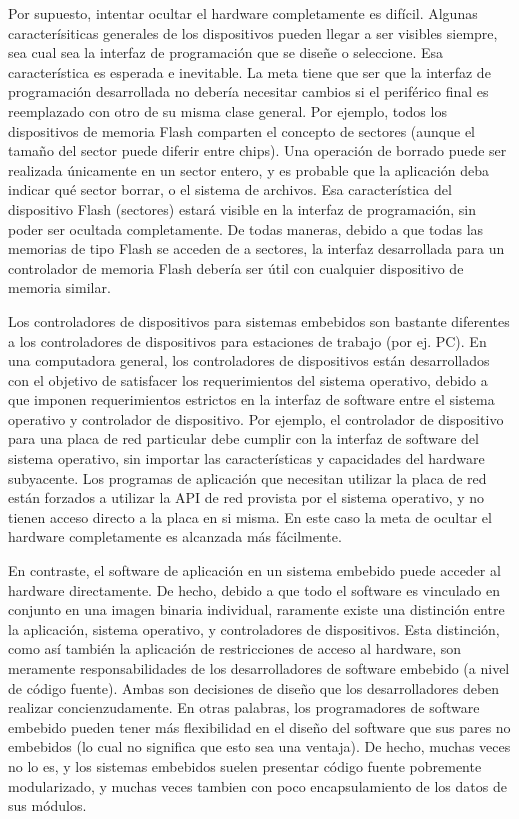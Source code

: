 \documentclass[output=paper, 
colorlinks,
citecolor=brown,
newtxmath
]{langscibook}
\begin{document}
Por supuesto, intentar ocultar el hardware completamente es difícil. 
Algunas caracterísiticas generales de los dispositivos pueden llegar
a ser visibles siempre, sea cual
sea la interfaz de programación que se diseñe o seleccione.
Esa característica es esperada e inevitable. La meta tiene que ser 
que la interfaz de programación
desarrollada no debería necesitar cambios si el periférico final es reemplazado
con otro de su misma clase general. Por ejemplo, todos los dispositivos de memoria
Flash comparten el concepto de sectores (aunque el tamaño del sector
puede diferir entre chips). Una operación de borrado puede ser realizada
únicamente en un sector entero, y es probable que la aplicación deba indicar
qué sector borrar, o el sistema de archivos. Esa característica del dispositivo 
Flash (sectores) estará visible en la interfaz de programación,
sin poder ser ocultada completamente. De todas maneras, debido a que todas
las memorias de tipo Flash se acceden de a sectores, 
la interfaz desarrollada
para un controlador de memoria Flash debería ser útil con cualquier
dispositivo de memoria similar.

Los controladores de dispositivos para sistemas embebidos son bastante
diferentes a los controladores de dispositivos para estaciones de trabajo (por ej. PC).
En una computadora general, los controladores de dispositivos están
desarrollados con el objetivo de satisfacer los requerimientos del sistema
operativo, debido a que imponen
requerimientos estrictos en la interfaz de software entre el sistema operativo
y controlador de dispositivo. Por ejemplo, el controlador de dispositivo para una placa 
de red particular debe cumplir con la interfaz de software del sistema operativo, 
sin importar las características
y capacidades del hardware subyacente. Los programas de aplicación que 
necesitan utilizar la placa de red están forzados a utilizar la API
de red provista por el sistema operativo, y no tienen acceso directo a la
placa en si misma. En este caso la meta de ocultar el hardware completamente
es alcanzada más fácilmente.

En contraste, el software de aplicación en un sistema embebido  puede acceder al
hardware directamente. De hecho, debido a que todo el software es
vinculado en conjunto en una imagen binaria individual, raramente existe una
distinción entre la aplicación, sistema operativo, y controladores
de dispositivos.
Esta distinción, como así también la aplicación de restricciones de acceso 
al hardware,
son meramente responsabilidades de los desarrolladores de software embebido
(a nivel de código fuente).
Ambas son decisiones de diseño que los desarrolladores deben realizar
concienzudamente. En otras palabras, los programadores de software 
embebido pueden tener más flexibilidad en el diseño del software
que sus pares no embebidos (lo cual no significa que esto sea
una ventaja). De hecho, muchas veces no lo es, y los sistemas embebidos
suelen presentar código fuente pobremente modularizado, y muchas
veces tambien con poco encapsulamiento de los datos de sus módulos.
\end{document}
